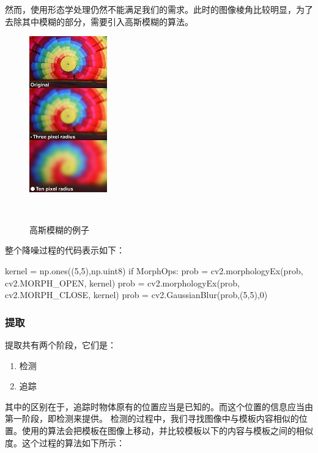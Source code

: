 然而，使用形态学处理仍然不能满足我们的需求。此时的图像棱角比较明显，为了去除其中模糊的部分，需要引入高斯模糊的算法。
\begin{figure}[h]

  \centering
    \includegraphics[width=0.3\textwidth]{../Pictures/blur.jpg}
    \caption{高斯模糊的例子}\\
\end{figure}
整个降噪过程的代码表示如下：\newpage
\begin{python}
kernel = np.ones((5,5),np.uint8)
                if MorphOps:
                    prob = cv2.morphologyEx(prob, cv2.MORPH_OPEN, kernel)
                    prob = cv2.morphologyEx(prob, cv2.MORPH_CLOSE, kernel)
                prob = cv2.GaussianBlur(prob,(5,5),0)
\end{python}
\subsubsection{提取}
提取共有两个阶段，它们是：
\begin{enumerate}
  \item 检测
  \item 追踪
\end{enumerate}
其中的区别在于，追踪时物体原有的位置应当是已知的。而这个位置的信息应当由第一阶段，即检测来提供。
检测的过程中，我们寻找图像中与模板内容相似的位置。使用的算法会把模板在图像上移动，并比较模板以下的内容与模板之间的相似度。这个过程的算法如下所示：

